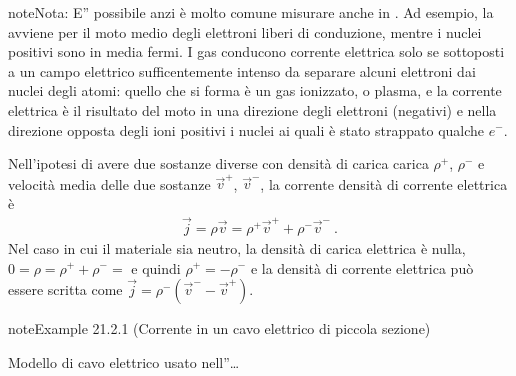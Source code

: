 \documentclass[letterpaper,10pt,italian]{jupyterBook}
\begin{document}
\begin{sphinxadmonition}{note}{Nota:}
\sphinxAtStartPar
E” possibile \sphinxhyphen{} anzi è molto comune \sphinxhyphen{} misurare  anche in . Ad esempio, la {\hyperref[\detokenize{ch/electromagnetism/electric-current:physics-hs-electromagnetism-electric-current-solids-conductor}]{}} avviene per il moto medio degli elettroni liberi di conduzione, mentre i nuclei positivi sono in media fermi. I gas conducono corrente elettrica solo se sottoposti a un campo elettrico sufficentemente intenso da separare alcuni elettroni dai nuclei degli atomi: quello che si forma è un gas ionizzato, o plasma, e la corrente elettrica è il risultato del moto in una direzione degli elettroni (negativi) e nella direzione opposta degli ioni positivi \sphinxhyphen{} i nuclei ai quali è stato strappato qualche \(e^-\).

\sphinxAtStartPar
Nell’ipotesi di avere due sostanze diverse con densità di carica carica \(\rho^+\), \(\rho^-\) e velocità media delle due sostanze \(\vec{v}^+\), \(\vec{v}^-\), la corrente densità di corrente elettrica è
\begin{equation*}
\begin{split}\vec{j} = \rho \vec{v} = \rho^+ \vec{v}^+ + \rho^- \vec{v}^- \ . \end{split}
\end{equation*}
\sphinxAtStartPar
Nel caso in cui il materiale sia neutro, la densità di carica elettrica è nulla, \(0 = \rho = \rho^+ + \rho^- =\) e quindi \(\rho^+ = - \rho^-\) e la densità di corrente elettrica può essere scritta come \(\vec{j} = \rho^- (\vec{v}^- - \vec{v}^+)\).
\end{sphinxadmonition}
\label{ch/electromagnetism/electric-current:electric-current-wire}
\begin{sphinxadmonition}{note}{Example 21.2.1 (Corrente in un cavo elettrico di piccola sezione)}



\sphinxAtStartPar
Modello di cavo elettrico usato nell”{\hyperref[\detokenize{ch/electromagnetism/circuits-electric:physics-hs-electromagnetism-circuits-electric}]{}}…
\end{sphinxadmonition}
\end{document}
